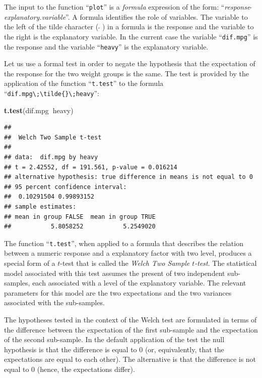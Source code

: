 \documentclass[]{krantz}
\makeatletter
\newenvironment{Shaded}{\begin{snugshade}}{\end{snugshade}}
\newcommand{\KeywordTok}[1]{\textcolor[rgb]{0.13,0.29,0.53}{\textbf{#1}}}
\newcommand{\NormalTok}[1]{#1}
\newcommand{\OperatorTok}[1]{\textcolor[rgb]{0.81,0.36,0.00}{\textbf{#1}}}
\newenvironment{kframe}{%
\medskip{}
\setlength{\fboxsep}{.8em}
 \def\at@end@of@kframe{}%
 \ifinner\ifhmode%
  \def\at@end@of@kframe{\end{minipage}}%
  \begin{minipage}{\columnwidth}%
 \fi\fi%
 \def\FrameCommand##1{\hskip\@totalleftmargin \hskip-\fboxsep
 \colorbox{shadecolor}{##1}\hskip-\fboxsep
     \hskip-\linewidth \hskip-\@totalleftmargin \hskip\columnwidth}%
 \MakeFramed {\advance\hsize-\width
   \@totalleftmargin\z@ \linewidth\hsize
   \@setminipage}}%
 {\par\unskip\endMakeFramed%
 \at@end@of@kframe}
\renewenvironment{Shaded}{\begin{kframe}}{\end{kframe}}
\theoremstyle{definition}
\theoremstyle{definition}
\theoremstyle{definition}
\theoremstyle{remark}
\makeatother
\begin{document}
The input to the function ``\texttt{plot}'' is a \emph{formula} expression of the
form: ``\emph{response\(\;\tilde{}\;\)explanatory.variable}''. A formula
identifies the role of variables. The variable to the left of the tilde
character (\(\;\tilde{}\;\)) in a formula is the response and the variable
to the right is the explanatory variable. In the current case the
variable ``\texttt{dif.mpg}'' is the response and the variable ``\texttt{heavy}'' is the
explanatory variable.

Let us use a formal test in order to negate the hypothesis that the
expectation of the response for the two weight groups is the same. The
test is provided by the application of the function ``\texttt{t.test}'' to the
formula ``\texttt{dif.mpg\textbackslash{};\textbackslash{}tilde\{\}\textbackslash{};heavy}'':

\begin{Shaded}
\begin{Highlighting}[]
\KeywordTok{t.test}\NormalTok{(dif.mpg}\OperatorTok{~}\NormalTok{heavy)}
\end{Highlighting}
\end{Shaded}

\begin{verbatim}
## 
##  Welch Two Sample t-test
## 
## data:  dif.mpg by heavy
## t = 2.42552, df = 191.561, p-value = 0.016214
## alternative hypothesis: true difference in means is not equal to 0
## 95 percent confidence interval:
##  0.10291504 0.99893152
## sample estimates:
## mean in group FALSE  mean in group TRUE 
##           5.8058252           5.2549020
\end{verbatim}

The function ``\texttt{t.test}'', when applied to a formula that describes the
relation between a numeric response and a explanatory factor with two
level, produces a special form of a \(t\)-test that is called the \emph{Welch
Two Sample \(t\)-test}. The statistical model associated with this test
assumes the present of two independent sub-samples, each associated with
a level of the explanatory variable. The relevant parameters for this
model are the two expectations and the two variances associated with the
sub-samples.

The hypotheses tested in the context of the Welch test are formulated in
terms of the difference between the expectation of the first sub-sample
and the expectation of the second sub-sample. In the default application
of the test the null hypothesis is that the difference is equal to 0
(or, equivalently, that the expectations are equal to each other). The
alternative is that the difference is not equal to 0 (hence, the
expectations differ).
\end{document}
